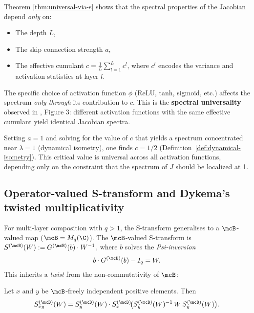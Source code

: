 \begin{remark}\label{rem:universality_interpretation}
Theorem \ref{thm:universal-via-s} shows that the spectral properties of the Jacobian depend \emph{only} on:
\begin{itemize}
\item The depth $L$,
\item The skip connection strength $a$,
\item The effective cumulant $c = \frac{1}{L}\sum_{l=1}^L c^l$, where $c^l$ encodes the variance and activation statistics at layer $l$.
\end{itemize}

The specific choice of activation function $\phi$ (ReLU, tanh, sigmoid, etc.) affects the spectrum \emph{only through} its contribution to $c$. This is the \textbf{spectral universality} observed in \cite{tarnowski2019dynamical}, Figure 3: different activation functions with the same effective cumulant yield identical Jacobian spectra.
\end{remark}

\begin{remark}\label{rem:dynamical_isometry}
Setting $a = 1$ and solving for the value of $c$ that yields a spectrum concentrated near $\lambda = 1$ (dynamical isometry), one finds $c = 1/2$ (Definition~\ref{def:dynamical-isometry}). This critical value is universal across all activation functions, depending only on the constraint that the spectrum of $J$ should be localized at 1.
\end{remark}

\subsection{Operator-valued S-transform and Dykema's twisted multiplicativity}\label{app:ov-s-transform}

For multi-layer composition with $q > 1$, the S-transform generalises to a $\mcB$-valued map ($\mcB = M_q(\C)$). The $\mcB$-valued S-transform is $S^{(\mcB)}(W) := G^{(\mcB)}(b) \cdot W^{-1}$, where $b$ solves the \emph{Psi-inversion}
\begin{equation}\label{eq:psi-inversion}
b \cdot G^{(\mcB)}(b) - I_q = W.
\end{equation}
This inherits a \emph{twist} from the non-commutativity of $\mcB$:

\begin{theorem}[Dykema, 2006]\label{thm:dykema}
Let $x$ and $y$ be $\mcB$-freely independent positive elements. Then
\begin{equation}\label{eq:twisted-mult}
S^{(\mcB)}_{xy}(W) = S^{(\mcB)}_y(W) \cdot S^{(\mcB)}_x\!\bigl(S^{(\mcB)}_y(W)^{-1} \, W \, S^{(\mcB)}_y(W)\bigr).
\end{equation}
\end{theorem}

